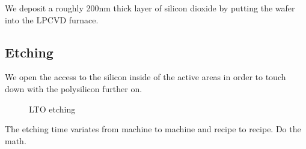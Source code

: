 We deposit a roughly 200nm thick layer of silicon dioxide by putting the wafer into the LPCVD furnace.

\newpage

\subsection{Etching}\label{fox_etch}

We open the access to the silicon inside of the active areas in order to touch down with the polysilicon further on.

\begin{figure}[H]
	\centering
	\begin{tikzpicture}[node distance = 3cm, auto, thick,scale=\CrossSectionOnly, every node/.style={transform shape}]
		
	\end{tikzpicture}
	\drawStepArrow{}
	\begin{tikzpicture}[node distance = 3cm, auto, thick,scale=\CrossSectionOnly, every node/.style={transform shape}]
		
	\end{tikzpicture}
	\caption{LTO etching}
\end{figure}

The etching time variates from machine to machine and recipe to recipe. Do the math.

